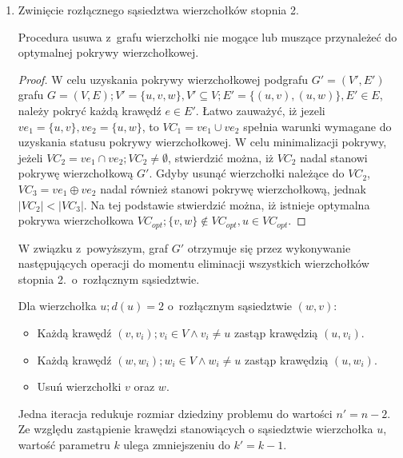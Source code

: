 \begin{enumerate}
  \item Zwinięcie rozłącznego sąsiedztwa wierzchołków stopnia 2.
    \begin{theorem}
      Procedura usuwa z~grafu wierzchołki nie mogące lub muszące przynależeć do 
      optymalnej pokrywy wierzchołkowej.
    \end{theorem}
    \begin{proof}
      W celu uzyskania pokrywy wierzchołkowej podgrafu $G\prime=(V\prime,E\prime)$
      grafu ${G=(V,E); V\prime=\{u, v, w\}, V\prime \subseteq V; E\prime=\{(u,v),
      (u,w)\}, E\prime \in E}$,
      należy pokryć każdą krawędź $e \in E\prime$. 
      Łatwo zauważyć, iż jezeli $ve_1=\{u,v\}, ve_2=\{u,w\}$, 
      to $VC_1=ve_1 \cup ve_2$ spełnia warunki wymagane do uzyskania statusu
      pokrywy wierzchołkowej.
      W celu minimalizacji pokrywy, jeżeli $VC_2=ve_1 \cap ve_2; VC_2 \neq \emptyset$,
      stwierdzić można, iż $VC_2$ nadal stanowi pokrywę wierzchołkową $G\prime$.
      Gdyby usunąć wierzchołki należące do $VC_2$, $VC_3=ve_1 \oplus ve_2$ nadal
      również stanowi pokrywę wierzchołkową, jednak $|VC_2| < |VC_3|$.
      Na tej podstawie stwierdzić można, iż istnieje optymalna pokrywa
      wierzchołkowa $VC_{opt}; \{v,w\} \notin VC_{opt}, u \in VC_{opt}$.
    \end{proof}

    W związku z~powyższym, graf $G\prime$ otrzymuje się przez wykonywanie
    następujących operacji do momentu eliminacji wszystkich wierzchołków stopnia
    2.\ o~rozłącznym sąsiedztwie.

    Dla wierzchołka $u; d(u)=2$ o~rozłącznym sąsiedztwie $(w,v)$:
    \begin{itemize}
      \item Każdą krawędź $(v,v_i); v_i \in V \land v_i \neq u$ zastąp 
        krawędzią $(u, v_i)$.
      \item Każdą krawędź $(w,w_i); w_i \in V \land w_i \neq u$ zastąp
        krawędzią $(u, w_i)$.
      \item Usuń wierzchołki $v$ oraz $w$.
    \end{itemize}
    Jedna iteracja redukuje rozmiar dziedziny problemu do wartości
    $n\prime=n-2$.
    Ze względu zastąpienie krawędzi stanowiących o sąsiedztwie wierzchołka $u$,
    wartość parametru $k$ ulega zmniejszeniu do $k\prime=k-1$.

\end{enumerate}

